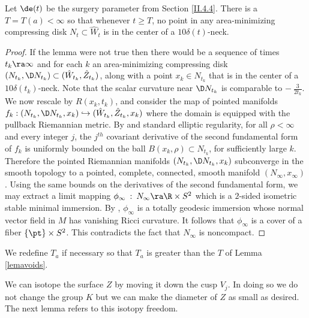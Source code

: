 \begin{lemma}
  \label{lem:kl-incompressibility-cuspidal-tori-existence-ricci-flow-surgery}

\label{lemavoids}
Let $\de(t)$ be the surgery parameter from
Section \ref{II.4.4}. There is a $T = T(a) < \infty$ so that whenever $t \ge T$,
no point in any area-minimizing compressing disk  $N_t\subset \hat W_t$ is in the
center of a $10 \delta(t)$-neck.
\end{lemma}
\begin{proof}
If the lemma were not true then
there would be a sequence of times $t_k\ra\infty$
and  for each $k$ an area-minimizing compressing disk $(N_{t_k},\D N_{t_k})
\subset (\hat W_{t_k},\hat Z_{t_k})$,
along with a point $x_k \in N_{t_k}$ that is in the center of a
$10 \delta(t_k)$-neck.
Note that the scalar curvature
near $\D N_{t_k}$ is comparable to $- \: \frac{3}{2t_k}$.
We now rescale by  $R(x_k, t_k)$, and consider the map of pointed
manifolds $f_k:(N_{t_k},\D N_{t_k},x_k)\hookrightarrow (\hat W_{t_k},\hat Z_{t_k},x_k)$
where the domain is equipped with the pullback Riemannian metric.
By \cite{schoen} and standard elliptic regularity, for all $\rho<\infty$
and every integer $j$, the $j^{th}$ covariant derivative of the
second fundamental form of $f_k$ is uniformly bounded on the ball $B(x_k,\rho)\subset N_{t_k}$,
for sufficiently large $k$.  Therefore the pointed Riemannian
manifolds $(N_{t_k},\D N_{t_k},x_k)$
subconverge in the smooth topology to a pointed, complete, connected, smooth manifold
$(N_\infty,x_\infty)$.  Using the same bounds on the derivatives
of the second fundamental form, we may extract a limit mapping
$\phi_{\infty} \: : \: N_{\infty} \ra \R \times S^2$ which
is a $2$-sided  isometric stable minimal immersion.
By  \cite[Theorem 2]{schoenyau}, $\phi_{\infty}$ is a totally geodesic
immersion whose normal vector field in $M$ has vanishing Ricci curvature.
It follows that $\phi_{\infty}$ is a cover of
a fiber $\{ \pt \}\times S^2$.  This contradicts the fact that $N_\infty$ is noncompact.
\end{proof}

We redefine $T_a$ if necessary so that $T_a$ is greater than the $T$ of
Lemma \ref{lemavoids}.


We can isotope the surface $Z$ by moving it down the cusp $V_j$. In doing so
we do not change the group $K$
but we can make the diameter of $Z$ as small as desired. The next lemma
refers to this isotopy freedom.


